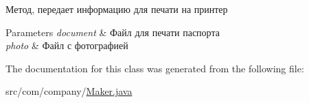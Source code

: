 Метод, передает информацию для печати на принтер 


\begin{DoxyParams}{Parameters}
{\em document} & Файл для печати паспорта \\
\hline
{\em photo} & Файл с фотографией \\
\hline
\end{DoxyParams}


The documentation for this class was generated from the following file\+:\begin{DoxyCompactItemize}
\item 
src/com/company/\mbox{\hyperlink{Maker_8java}{Maker.\+java}}\end{DoxyCompactItemize}
